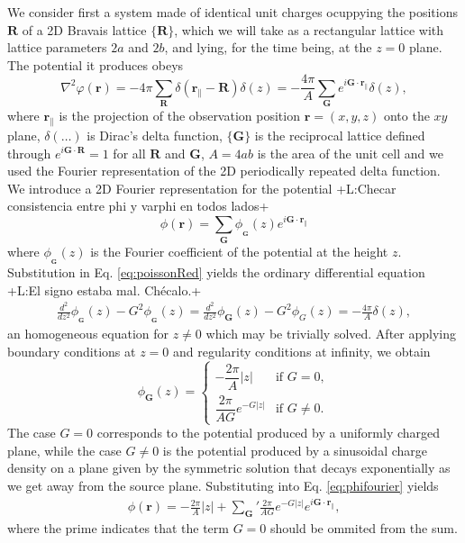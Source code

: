 \documentclass{article}
\newcommand{\abs}[1]{\lvert#1\rvert}
\newcommand{\notaL}[1]{{\color{blue}+L:#1+}}
\begin{document}
We consider first a system made of identical unit charges
ocuppying the positions $\bm R$ of a 2D Bravais lattice $\{\bm R\}$,
which we will take as a rectangular lattice with lattice parameters
$2a$ and $2b$, and lying, for the time being, at the $z=0$ plane.
The potential it produces obeys
\begin{equation}
  \label{eq:poissonRed}
  \nabla^2\varphi(\bm r)=-4\pi\sum_{\bm R}\delta(\bm r_\|-\bm
  R)\delta(z)=-\frac{4\pi}{A}\sum_{\bm G}e^{i\bm G\cdot\bm r_\|}\delta(z),
\end{equation}
where $\bm r_\|$ is the projection of the observation position $\bm
r=(x,y,z)$ onto the $xy$ plane,
$\delta(\ldots)$ is Dirac's delta function, $\{\bm G\}$ is the
reciprocal lattice defined through $e^{i\bm G\cdot\bm R}=1$ for all
$\bm R$ and $\bm G$, $A=4ab$ is the area of the unit cell
and we used the Fourier representation of the 2D
periodically repeated delta function. We introduce a 2D Fourier representation for
the potential \notaL{Checar consistencia entre phi y varphi en todos lados}
\begin{equation}
  \label{eq:phifourier}
  \phi(\bm r)=\sum_{\bm G}\phi_{_{\bm G}}(z)e^{i\bm G\cdot\bm r_\|} 
\end{equation}
where $\phi_{_{\bm G}}(z)$ is the Fourier coefficient of the potential at
the height $z$. Substitution in Eq. \eqref{eq:poissonRed} yields the
ordinary differential equation \notaL{El signo estaba mal. Chécalo.}
 \begin{eqnarray}
 \frac{d^2}{dz^2}\phi_{_{\bm G}}(z)-G^2\phi_{_{\bm G}}(z)=
 \frac{d^2}{dz^2}\phi_{\bm G}(z)-G^2\phi_G(z)=
   -\frac{4 \pi}{A} \delta(z),
 \end{eqnarray}
an homogeneous equation for $z\ne0$ which may be trivially
solved. After applying boundary conditions at $z=0$ and regularity
conditions at infinity, we obtain
\begin{equation}
  \label{eq:phiG}
  \phi_{\bm G}(z)=
  \begin{cases}
    -\dfrac{2\pi}{A}\abs{z}&\text{if }G=0,\\
    \dfrac{2 \pi}{AG}  e^{- G \abs{z}}&\text{if }G\neq 0.
  \end{cases}
\end{equation}
The case $G=0$ corresponds to the potential produced by a uniformly charged plane,
while the case $G\ne 0$ is the potential produced by a sinusoidal
charge density on a plane given by the
symmetric solution that decays exponentially as we get away from
the source plane. Substituting into Eq. \eqref{eq:phifourier} yields
\begin{eqnarray}
  \label{eq:phiG1}
 \phi(\bm r) = -\frac{2 \pi}{A}  \abs{z} +{\sum_{\bm G}}' \frac{2 \pi
   }{AG} e^{- G \abs{z}} e^{i \bm G\cdot\bm r_\|},
 \end{eqnarray}
where the prime indicates that the term $G=0$ should be ommited from
the sum.
\end{document}
